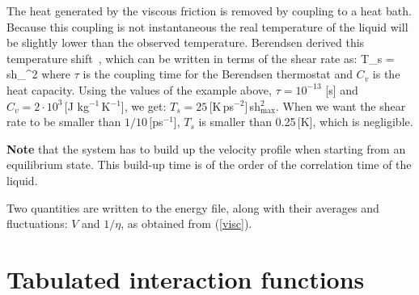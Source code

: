 The heat generated by the viscous friction is removed by coupling to a heat
bath. Because this coupling is not instantaneous the real temperature of the
liquid will be slightly lower than the observed temperature.
Berendsen derived this temperature shift~\cite{Berendsen91}, which can
be written in terms of the shear rate as:
\beq
T_s =  \mbox{sh}_{\max}^2
\eeq
where $\tau$ is the coupling time for the Berendsen thermostat and
$C_v$ is the heat capacity. Using the values of the example above,
$\tau=10^{-13}$ [s] and $C_v=2 \cdot 10^3$\,[J kg$^{-1}$\,K$^{-1}$], we
get: $T_s=25$\,[K\,ps$^{-2}$]\,sh$_{\max}^2$. When we want the shear
rate to be smaller than $1/10$\,[ps$^{-1}$], $T_s$ is smaller than
0.25\,[K], which is negligible.

{\bf Note} that the system has to build up the velocity profile when starting
from an equilibrium state. This build-up time is of the order of the
correlation time of the liquid.

Two quantities are written to the energy file, along with their averages
and fluctuations: $V$ and $1/\eta$, as obtained from (\ref{visc}).

\section{Tabulated interaction functions}
